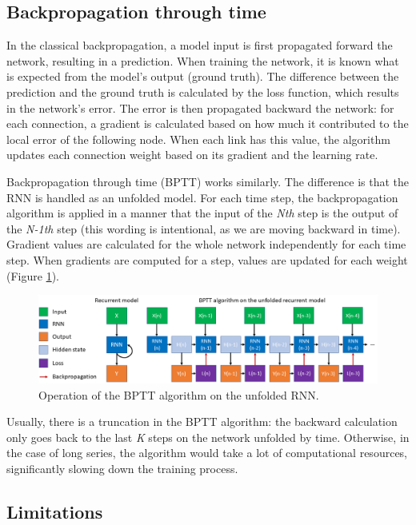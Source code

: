 \subsection{Backpropagation through time}

In the classical backpropagation, a model input is first propagated forward the network, resulting in a prediction. When training the network, it is known what is expected from the model's output (ground truth). The difference between the prediction and the ground truth is calculated by the loss function, which results in the network's error. The error is then propagated backward the network: for each connection, a gradient is calculated based on how much it contributed to the local error of the following node. When each link has this value, the algorithm updates each connection weight based on its gradient and the learning rate.

Backpropagation through time\cite{SequentialLecture} (BPTT) works similarly. The difference is that the RNN is handled as an unfolded model. For each time step, the backpropagation algorithm is applied in a manner that the input of the \textit{Nth} step is the output of the \textit{N-1th} step (this wording is intentional, as we are moving backward in time). Gradient values are calculated for the whole network independently for each time step. When gradients are computed for a step, values are updated for each weight (Figure \ref{fig:BPTT}).

\begin{figure}[htb]
 \centerline{\includegraphics[width=1.0\columnwidth]{.//Figure/Sequential/BPTT.png}}
 \caption{Operation of the BPTT algorithm on the unfolded RNN.}
 \label{fig:BPTT}
\end{figure}

Usually, there is a truncation in the BPTT algorithm: the backward calculation only goes back to the last \textit{K} steps on the network unfolded by time. Otherwise, in the case of long series, the algorithm would take a lot of computational resources, significantly slowing down the training process.

\subsection{Limitations}

